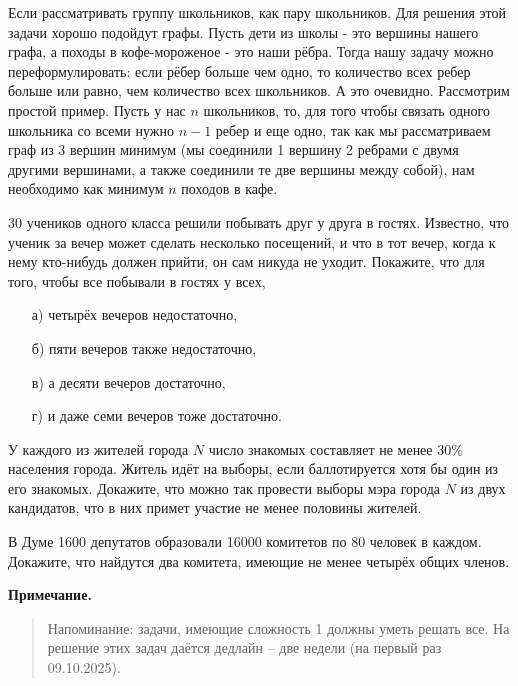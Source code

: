 \documentclass{article}
\begin{document}
\begin{solution}[6]
Если рассматривать группу школьников, как пару школьников.
Для решения этой задачи хорошо подойдут графы. Пусть дети из школы - это вершины нашего графа, а походы в кофе-мороженое - это наши рёбра. Тогда нашу задачу можно переформулировать: если рёбер больше чем одно, то количество всех ребер больше или равно, чем количество всех школьников. А это очевидно. Рассмотрим простой пример. Пусть у нас $n$ школьников, то, для того чтобы связать одного школьника со всеми нужно $n - 1$ ребер и еще одно, так как мы рассматриваем граф из 3 вершин минимум (мы соединили 1 вершину 2 ребрами с двумя другими вершинами, а также соединили те две вершины между собой), нам необходимо как минимум $n$ походов в кафе.

\end{solution}

\begin{task}[3]
30 учеников одного класса решили побывать друг у друга в гостях. Известно, что ученик за вечер может сделать несколько посещений, и что в тот вечер, когда к нему кто-нибудь должен прийти, он сам никуда не уходит. Покажите, что для того, чтобы все побывали в гостях у всех,
\begin{enumerate}
    \item[а)] четырёх вечеров недостаточно,
    \item[б)] пяти вечеров также недостаточно,
    \item[в)] а десяти вечеров достаточно,
    \item[г)] и даже семи вечеров тоже достаточно.
\end{enumerate}
\end{task}

\begin{task}[3]
У каждого из жителей города $N$ число знакомых составляет не менее 30\% населения города. Житель идёт на выборы, если баллотируется хотя бы один из его знакомых. Докажите, что можно так провести выборы мэра города $N$ из двух кандидатов, что в них примет участие не менее половины жителей.
\end{task}

\begin{task}[3]
В Думе 1600 депутатов образовали 16000 комитетов по 80 человек в каждом. Докажите, что найдутся два комитета, имеющие не менее четырёх общих членов.
\end{task}

\vspace{1.5em}
\noindent\textbf{Примечание.}
\begin{quote}
Напоминание: задачи, имеющие сложность 1 должны уметь решать все. На решение этих задач даётся дедлайн – две недели (на первый раз 09.10.2025).
\end{quote}
\end{document}
